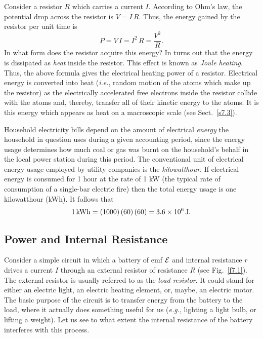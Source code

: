 Consider a resistor $R$ which carries a current $I$. According to Ohm's
law, the potential drop across the resistor is $V= I\, R$. Thus, the
energy gained by the resistor per unit time is
\begin{equation}
P = V \,I = I^2\,R = \frac{V^2}{R}.
\end{equation}
In what form does the resistor acquire this energy? In turns out that
the energy is dissipated as {\em heat} inside the resistor. This effect
is known as {\em Joule heating}. Thus, the above formula 
gives the electrical heating power of a resistor. Electrical energy is converted
into heat ({\em i.e.}, random motion of the atoms which make up the resistor)
as the electrically accelerated free electrons inside the resistor collide with the atoms and,
thereby, transfer all of their kinetic energy to the atoms. It is this
energy which appears  as heat on a macroscopic scale (see Sect.~\ref{s7.3}). 

Household electricity bills depend on  the amount of electrical
 {\em energy} the household in question uses during  a given accounting period,
since the energy usage determines how much coal or gas was burnt on 
the household's behalf
in the local power station during this period. The conventional unit of 
electrical energy usage employed
by utility companies is the {\em kilowatthour}. If electrical energy
is consumed for 1 hour at the rate of 1 kW (the typical rate of consumption of
a single-bar  electric fire) then the total energy usage is
one  kilowatthour (kWh). It follows that 
\begin{equation}
1\,{\rm kWh} =  (1000)\,(60)\,(60) = 3.6\times 10^6\,{\rm J}.
\end{equation}

\subsection{Power and Internal Resistance}\label{s7.9}
Consider a simple circuit in which a battery of emf ${\cal E}$ and internal 
resistance $r$ drives a current $I$ through an external resistor of resistance $R$
(see Fig.~\ref{f7.1}). The external resistor is usually referred
to as the {\em load resistor}.  It could stand for either an electric light,
an electric heating element, or, maybe, an electric motor. The 
basic purpose of
the circuit is to transfer energy from the battery to the load, where it actually
does something useful for us ({\em e.g.}, lighting
a light bulb, or lifting a weight). Let us see to what extent the internal resistance
of the battery interferes with this process.


